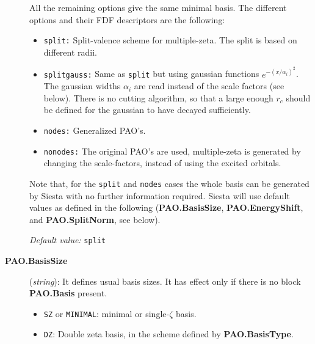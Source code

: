 \documentclass[11pt]{article}
\begin{document}
\begin{description}
\noindent
All the remaining options
give the same minimal basis. 
The different options and their FDF descriptors are the following:

\begin{itemize}

\item {\tt split:} Split-valence scheme for multiple-zeta.
The split is based on different radii. 

\item {\tt splitgauss:}
Same as {\tt split} but using gaussian functions
$e^{-(x/\alpha_i)^2}$. The gaussian widths $\alpha_i$ are read instead 
of the scale factors (see below). There is no cutting algorithm, so that
a large enough $r_c$ should be defined for the gaussian to have decayed
sufficiently.

\item {\tt nodes:} Generalized PAO's.

\item {\tt nonodes:} 
The original PAO's are used, multiple-zeta is generated
by changing the scale-factors, instead of using the excited orbitals. 

\end{itemize}

\noindent
Note that, for the {\tt split} and {\tt nodes} cases
the whole basis can be generated by {\sc Siesta} with no further information
required. {\sc Siesta} will use default values as defined in the following 
({\bf PAO.BasisSize},
{\bf PAO.EnergyShift}, and {\bf PAO.SplitNorm}, see below).

{\it Default value:} {\tt split}


\item[{\bf PAO.BasisSize}] ({\it string}): 
It defines usual basis sizes. It has effect only if there is no 
block {\bf PAO.Basis} present.

\begin{itemize}

\item {\tt SZ} or {\tt MINIMAL}: minimal or single-$\zeta$
basis.

\item {\tt DZ}: Double zeta basis, in the scheme
defined by {\bf PAO.BasisType}.


\end{itemize}
\end{description}
\end{document}
